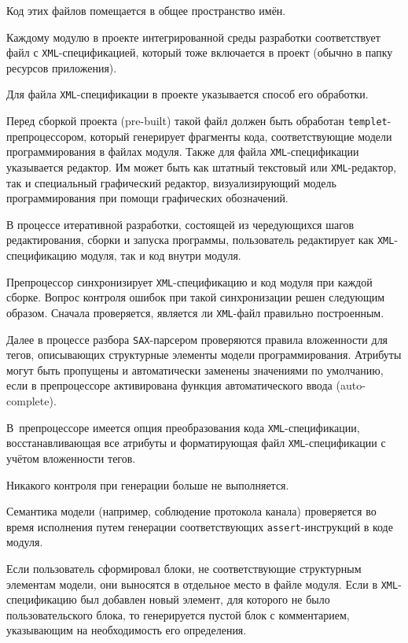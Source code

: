Код этих файлов помещается в общее пространство имён. 

Каждому модулю в проекте интегрированной среды разработки соответствует файл с {\tt XML}-спецификацией, который тоже включается в проект (обычно в папку ресурсов приложения). 

Для файла {\tt XML}-спецификации в проекте указывается способ его обработки. 

Перед сборкой проекта (pre-built) такой файл должен быть обработан {\tt templet}-препроцессором, который генерирует фрагменты кода, соответствующие модели программирования в файлах модуля. Также для файла {\tt XML}-спецификации указывается редактор. Им может быть как штатный текстовый или {\tt XML}-редактор, так и специальный графический редактор, визуализирующий модель программирования при помощи графических обозначений.



В процессе итеративной разработки, состоящей из чередующихся шагов редактирования, сборки и запуска программы, пользователь редактирует как {\tt XML}-спецификацию модуля, так и код внутри модуля. 

Препроцессор синхронизирует {\tt XML}-спецификацию и код модуля при каждой сборке. Вопрос контроля ошибок при такой синхронизации решен следующим образом. Сначала проверяется, является ли {\tt XML}-файл правильно построенным. 

Далее в процессе разбора {\tt SAX}-парсером проверяются правила вложенности для тегов, описывающих структурные элементы модели программирования. Атрибуты могут быть пропущены и автоматически заменены значениями по умолчанию, если в препроцессоре активирована функция автоматического ввода (auto-complete). 

В~препроцессоре имеется опция преобразования кода {\tt XML}-спецификации, восстанавливающая все атрибуты и форматирующая файл {\tt XML}-спецификации с учётом вложенности тегов. 

Никакого контроля при генерации больше не выполняется. 

Семантика модели (например, соблюдение протокола канала) проверяется во время исполнения путем генерации соответствующих {\tt assert}-инструкций в коде модуля. 

Если пользователь сформировал блоки, не соответствующие структурным элементам модели, они выносятся в отдельное место в файле модуля. Если в {\tt XML}-спецификацию был добавлен новый элемент, для которого не было пользовательского блока, то генерируется пустой блок с комментарием, указывающим на необходимость его определения. 

